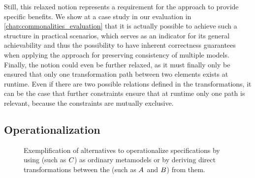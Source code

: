 Still, this relaxed notion represents a requirement for the \commonalities approach to provide specific benefits.
We show at a case study in our evaluation in \autoref{chap:commonalities_evaluation} that it is actually possible to achieve such a structure in practical scenarios, which serves as an indicator for its general achievability and thus the possibility to have inherent correctness guarantees when applying the \commonalities approach for preserving consistency of multiple models.
Finally, the notion could even be further relaxed, as it must finally only be ensured that only one transformation path between two elements exists at runtime.
Even if there are two possible relations defined in the transformations, it can be the case that further constraints ensure that at runtime only one path is relevant, because the constraints are mutually exclusive.



\subsection{Operationalization}
\label{chap:improvement:commonalities:operationalization}

\begin{figure}
    \centering
    
    \caption[Alternatives for \commonalities operationalization]{Exemplification of alternatives to operationalize \commonalities specifications by using \conceptmetamodels (such as $\metamodel{C}{}$) as ordinary metamodels or by deriving direct transformations between the \concretemetamodels (such as $\metamodel{A}{}$ and $\metamodel{B}{}$) from them.}
    \label{fig:improvement:operationalization_alternatives}
\end{figure}

